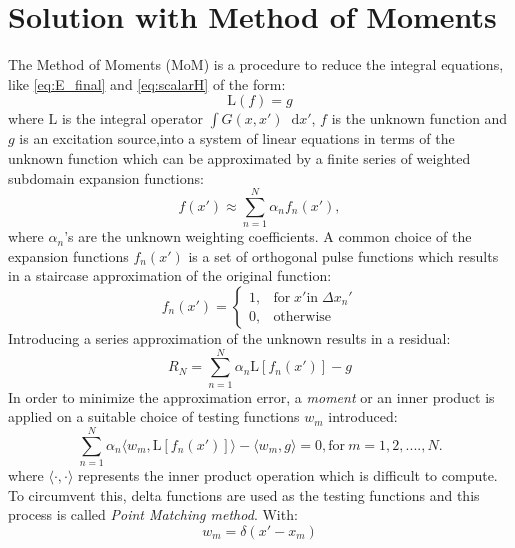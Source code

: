 \documentclass[11pt]{article}
\renewcommand{\^}{\hat}  %
\newcommand*\diff{\mathop{}\!\mathrm{d}} %
\begin{document}
\section*{Solution with Method of Moments}

The Method of Moments (MoM) is a procedure to reduce the integral equations, like \eqref{eq:E_final} and \eqref{eq:scalarH} of the form:
%
\begin{equation}
  \mathrm L (f) = g
  \label{eq:MoM}
\end{equation}
%
where $\mathrm L$ is the integral operator $\int G(x,x') \diff{x'}$, $f$ is the unknown function and $g$ is an excitation source,into a system of linear equations in terms of the unknown function which can be approximated by a finite series of weighted subdomain expansion functions:
\begin{equation}
  f(x') \approx \sum\limits_{n = 1}^N \alpha_n f_n(x'),
  \label{eq:MOM_f}
\end{equation}
%
where $\alpha_n$'s are the unknown weighting coefficients. A common choice of  the expansion functions $f_n(x')$ is a set of orthogonal pulse functions which results in a staircase approximation of the original function:
%
\begin{equation}
  f_n(x') =
  \begin{cases}
    1, & \text{for}\; x' \text{in}\; \Delta x_n'  \\
    0, & \text{otherwise}
  \end{cases}
  \label{eq:pulse}
\end{equation}
%
Introducing a series approximation of the unknown results in a residual:
\begin{equation}
  R_N = \sum \limits_{n = 1}^N \alpha_n \mathrm L [f_n(x')] - g
  \label{eq:residual}
\end{equation}
%
In order to minimize the approximation error, a \emph{moment} or an inner product is applied on a suitable choice of testing functions $w_m$ introduced:
%
\begin{equation}
  \sum \limits_{n = 1}^N \alpha_n \langle w_m, \mathrm L [f_n(x')] \rangle - \langle w_m, g \rangle = 0, \text{for}\ m = 1,2,....,N.
  \label{eq:moment}
\end{equation}
%
where $\langle \cdot, \cdot \rangle$ represents the inner product operation which is difficult to compute. To circumvent this, delta functions are used as the testing functions and this process is called \emph{ Point Matching method}. With:
%
\begin{equation}
  w_m = \delta(x' - x_m)
  \label{eq:delta}
\end{equation}
\end{document}
